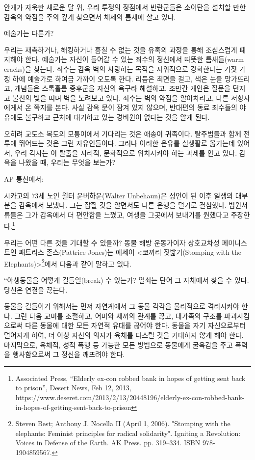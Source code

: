 \documentclass[11pt, b6paper, openany]{memoir}
\begin{document}
\begin{article}
안개가 자욱한 새로운 달 위, 우리 투쟁의 정점에서 반란군들은 소이탄을 설치할 만한 감옥의 약점을 주의 깊게 찾으면서 체제의 틈새에 살고 있다.

예술가는 다른가?

우리는 재촉하거나, 해킹하거나 훔칠 수 없는 것을 유혹의 과정을 통해 조심스럽게 폐지해야 한다. 예술가는 자신이 들어갈 수 있는 죄수의 정신에서 따뜻한 틈새들(warm cracks)을 찾는다. 죄수는 감옥 벽의 사랑하는 목적을 자위적으로 강화한다는 거짓 가정 하에 예술가로 하여금 가까이 오도록 한다. 리듬은 최면을 걸고, 색은 눈을 망가뜨리고, 개념들은 스톡홀름 증후군을 자신의 욕구라 해설하고, 조만간 개인은 질문을 던지고 불신의 빛을 띠며 벽을 노려보고 있다. 죄수는 벽의 약점을 알아차리고, 다른 저항자에게서 온 쪽지를 본다. 사실 감옥 문이 잠겨 있지 않으며, 반대편의 동료 죄수들의 야유에도 불구하고 근처에 대기하고 있는 경비원이 없다는 것을 알게 된다. 

오히려 교도소 복도의 모퉁이에서 기다리는 것은 애송이 귀족이다. 탈주범들과 함께 전투에 뛰어드는 것은 그런 자유인들이다. 그러나 이러한 은유를 실생활로 옮기는데 있어서, 우리 각자는 이 탈출을 지리적, 문화적으로 위치시켜야 하는 과제를 안고 있다. 감옥을 나왔을 때, 우리는 무엇을 보는가?

    AP 통신에서: 

    시카고의 73세 노인 월터 운버하운(Walter Unbehaun)은 성인이 된 이후 일생의 대부분을 감옥에서 보냈다. 그는 잡힐 것을 알면서도 다른 은행을 털기로 결심했다. 법원서류들은 그가 감옥에서 더 편안함을 느꼈고, 여생을 그곳에서 보내기를 원했다고 주장한다.\footnote{Associated Press, “Elderly ex-con robbed bank in hopes of getting sent back to prison”, Desert News, Feb 12, 2013, https://www.deseret.com/2013/2/13/20448196/elderly-ex-con-robbed-bank-in-hopes-of-getting-sent-back-to-prison}

우리는 어떤 다른 것을 기대할 수 있을까? 동물 해방 운동가이자 상호교차성 페미니스트인 패트리스 존스(Pattrice Jones)는 에세이 <코끼리 짓밟기(Stomping with the Elephants)>\footnote{Steven Best; Anthony J. Nocella II (April 1, 2006). "Stomping with the elephants: Feminist principles for radical solidarity". Igniting a Revolution: Voices in Defense of the Earth. AK Press. pp. 319–334. ISBN 978-1904859567.}에서 다음과 같이 말하고 있다. 

    “야생동물을 어떻게 길들일(break) 수 있는가? 열쇠는 단어 그 자체에서 찾을 수 있다. 당신은 연결을 끊는다. 

    동물을 길들이기 위해서는 먼저 자연계에서 그 동물 각각을 물리적으로 격리시켜야 한다. 그런 다음 교미를 조절하고, 어미와 새끼의 관계를 끊고, 대가족의 구조를 파괴시킴으로써 다른 동물에 대한 모든 자연적 유대를 끊어야 한다. 동물을 자기 자신으로부터 멀어지게 하여, 더 이상 자신의 의지가 육체를 다스릴 것을 기대하지 않게 해야 한다. 마지막으로, 육체적, 성적 폭행 등 가능한 모든 방법으로 동물에게 굴욕감을 주고 폭력을 행사함으로써 그 정신을 깨뜨려야 한다. 


\end{article}
\end{document}

